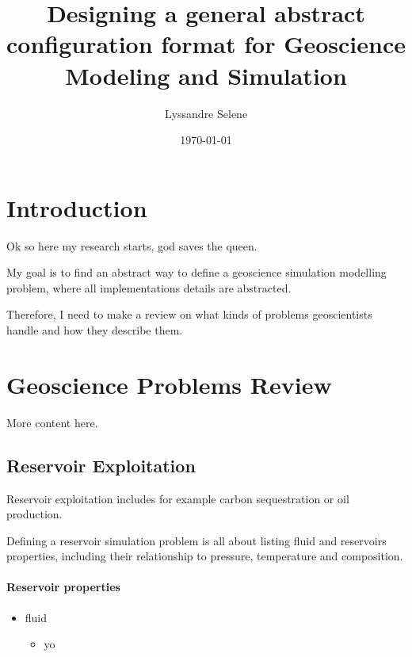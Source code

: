 \documentclass{article} %
\title{Designing a general abstract configuration format for Geoscience Modeling and Simulation}
\author{Lyssandre Selene}
\date{\today}
\begin{document}

\maketitle %

\section{Introduction} %
Ok so here my research starts, god saves the queen.

My goal is to find an abstract way to define a geoscience simulation modelling problem,
where all implementations details are abstracted.

Therefore, I need to make a review on what kinds of problems geoscientists handle and how they describe them.

\section{Geoscience Problems Review}
More content here. 

\subsection{Reservoir Exploitation}
Reservoir exploitation includes for example carbon sequestration or oil production.

Defining a reservoir simulation problem is all about listing fluid and reservoirs properties, 
including their relationship to pressure, temperature and composition. \cite{reservoir-review}


\paragraph{Reservoir properties}
\begin{itemize}
  \item fluid 
    \begin{itemize}
      \item yo
    
  \end{itemize} 
\end{itemize}
\end{document}
